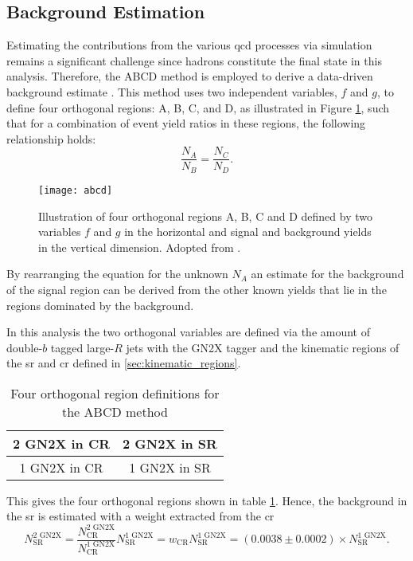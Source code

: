 \subsection{Background Estimation}\label{sec:abcd}
Estimating the contributions from the various \ac{qcd} processes via simulation remains a significant challenge since hadrons constitute the final state in this analysis. Therefore, the ABCD method is employed to derive a data-driven background estimate \citep{buttinger2018background,PhysRevD.103.035021}. This method uses two independent variables, $f$ and $g$, to define four orthogonal regions: A, B, C, and D, as illustrated in Figure \ref{fig:abcd}, such that for a combination of event yield ratios in these regions, the following relationship holds:
\begin{equation}
    \frac{N_A}{N_B}=\frac{N_C}{N_D}.
\end{equation}
\begin{figure}
    \centering
    \texttt{[image: abcd]}
    \caption[]{Illustration of four orthogonal regions A, B, C and D defined by two variables $f$ and $g$ in the horizontal and signal and background yields in the vertical dimension. Adopted from \citep{PhysRevD.103.035021}.}
    \label{fig:abcd}
\end{figure}
By rearranging the equation for the unknown $N_A$ an estimate for the background of the signal region can be derived from the other known yields that lie in the regions dominated by the background.

In this analysis the two orthogonal variables are defined via the amount of double-$b$ tagged large-$R$ jets with the GN2X tagger and the kinematic regions of the \ac{sr} and \ac{cr} defined in \ref{sec:kinematic_regions}.
\begin{table}[htbp]
    \centering
    \caption{Four orthogonal region definitions for the ABCD method}
    \begin{tabular}{|c|c|}
        \hline
        2 GN2X in CR & 2 GN2X in SR \\ \hline
        1 GN2X in CR & 1 GN2X in SR \\ \hline
    \end{tabular}
    \label{tab:abcd}
\end{table}
This gives the four orthogonal regions shown in table \ref{tab:abcd}. Hence, the background in the \ac{sr} is estimated with a weight extracted from the \ac{cr}
\begin{equation}
    N_\text{SR}^\text{2 GN2X}=\frac{N_\text{CR}^\text{2 GN2X}}{N_\text{CR}^\text{1 GN2X}} N_\text{SR}^\text{1 GN2X} = w_\text{CR} N_\text{SR}^\text{1 GN2X}=  (0.0038 \pm 0.0002) \times N_\text{SR}^\text{1 GN2X}.
\end{equation}

